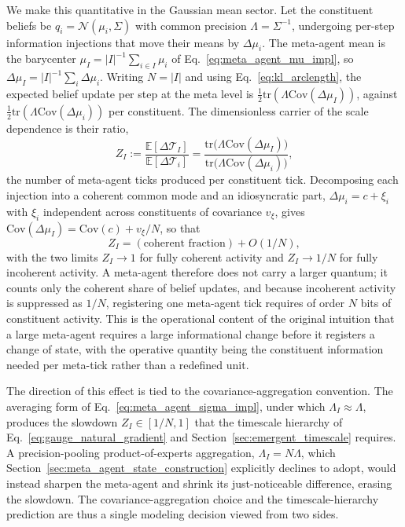 We make this quantitative in the Gaussian mean sector. Let the constituent beliefs be $q_i = \mathcal{N}(\mu_i, \Sigma)$ with common precision $\Lambda = \Sigma^{-1}$, undergoing per-step information injections that move their means by $\Delta\mu_i$. The meta-agent mean is the barycenter $\mu_I = |I|^{-1}\sum_{i\in I}\mu_i$ of Eq.~\eqref{eq:meta_agent_mu_impl}, so $\Delta\mu_I = |I|^{-1}\sum_i \Delta\mu_i$. Writing $N = |I|$ and using Eq.~\eqref{eq:kl_arclength}, the expected belief update per step at the meta level is $\tfrac{1}{2}\mathrm{tr}(\Lambda\mathrm{Cov}(\Delta\mu_I))$, against $\tfrac{1}{2}\mathrm{tr}(\Lambda\mathrm{Cov}(\Delta\mu_i))$ per constituent. The dimensionless carrier of the scale dependence is their ratio,
\begin{equation}
Z_I := \frac{\mathbb{E}[\Delta\mathcal{T}_I]}{\mathbb{E}[\Delta\mathcal{T}_i]} = \frac{\mathrm{tr}\big(\Lambda\mathrm{Cov}(\Delta\mu_I)\big)}{\mathrm{tr}\big(\Lambda\mathrm{Cov}(\Delta\mu_i)\big)},
\label{eq:bit_production_ratio}
\end{equation}
the number of meta-agent ticks produced per constituent tick. Decomposing each injection into a coherent common mode and an idiosyncratic part, $\Delta\mu_i = c + \xi_i$ with $\xi_i$ independent across constituents of covariance $v_\xi$, gives $\mathrm{Cov}(\Delta\mu_I) = \mathrm{Cov}(c) + v_\xi/N$, so that
\begin{equation}
Z_I = (\text{coherent fraction}) + O(1/N),
\label{eq:Z_decomposition}
\end{equation}
with the two limits $Z_I \to 1$ for fully coherent activity and $Z_I \to 1/N$ for fully incoherent activity. A meta-agent therefore does not carry a larger quantum; it counts only the coherent share of belief updates, and because incoherent activity is suppressed as $1/N$, registering one meta-agent tick requires of order $N$ bits of constituent activity. This is the operational content of the original intuition that a large meta-agent requires a large informational change before it registers a change of state, with the operative quantity being the constituent information needed per meta-tick rather than a redefined unit.

The direction of this effect is tied to the covariance-aggregation convention. The averaging form of Eq.~\eqref{eq:meta_agent_sigma_impl}, under which $\Lambda_I \approx \Lambda$, produces the slowdown $Z_I \in [1/N, 1]$ that the timescale hierarchy of Eq.~\eqref{eq:gauge_natural_gradient} and Section~\ref{sec:emergent_timescale} requires. A precision-pooling product-of-experts aggregation, $\Lambda_I = N\Lambda$, which Section~\ref{sec:meta_agent_state_construction} explicitly declines to adopt, would instead sharpen the meta-agent and shrink its just-noticeable difference, erasing the slowdown. The covariance-aggregation choice and the timescale-hierarchy prediction are thus a single modeling decision viewed from two sides.

